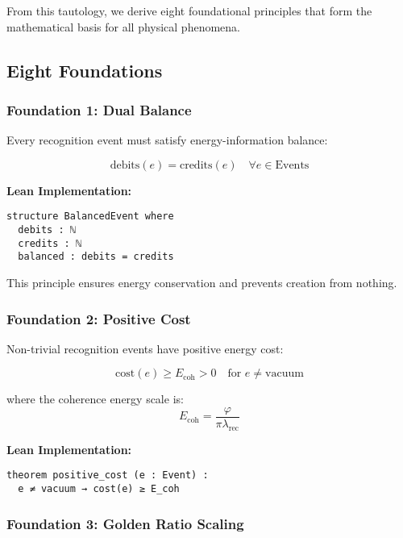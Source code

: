 \documentclass[11pt]{amsart}
\theoremstyle{plain}
\theoremstyle{definition}
\theoremstyle{remark}
\newcommand{\Ecoh}{E_{\text{coh}}}
\newcommand{\lambdarec}{\lambda_{\text{rec}}}
\begin{document}
From this tautology, we derive eight foundational principles that form the mathematical basis for all physical phenomena.

\subsection{Eight Foundations}

\subsubsection{Foundation 1: Dual Balance}

Every recognition event must satisfy energy-information balance:

\begin{equation}
\text{debits}(e) = \text{credits}(e) \quad \forall e \in \text{Events}
\end{equation}

\textbf{Lean Implementation:}
\begin{lstlisting}
structure BalancedEvent where
  debits : ℕ
  credits : ℕ  
  balanced : debits = credits
\end{lstlisting}

This principle ensures energy conservation and prevents creation from nothing.

\subsubsection{Foundation 2: Positive Cost}

Non-trivial recognition events have positive energy cost:

\begin{equation}
\text{cost}(e) \geq \Ecoh > 0 \quad \text{for } e \neq \text{vacuum}
\end{equation}

where the coherence energy scale is:
\begin{equation}
\Ecoh = \frac{\varphi}{\pi \lambdarec}
\end{equation}

\textbf{Lean Implementation:}
\begin{lstlisting}
theorem positive_cost (e : Event) : 
  e ≠ vacuum → cost(e) ≥ E_coh
\end{lstlisting}

\subsubsection{Foundation 3: Golden Ratio Scaling}
\end{document}
